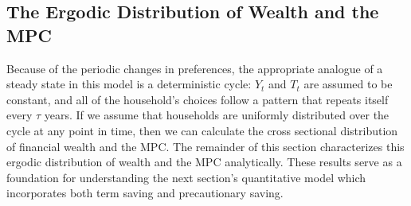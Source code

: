 \documentclass[fleqccn,12pt]{article}
\begin{document}
\subsection{The Ergodic Distribution of Wealth and the MPC\label{steady state}}

Because of the periodic changes in preferences, the appropriate analogue of a steady state in this model is a deterministic cycle: $Y_t$ and $T_t$ are assumed to be constant, and all of the household's choices follow a pattern that repeats itself every $\tau$ years. If we assume that households are uniformly distributed over the cycle at any point in time, then we can calculate the cross sectional distribution of financial wealth and the MPC. The remainder of this section characterizes this ergodic distribution of wealth and the MPC analytically. These results serve as a foundation for understanding the next section's quantitative model which incorporates both term saving and precautionary saving.  
\end{document}

